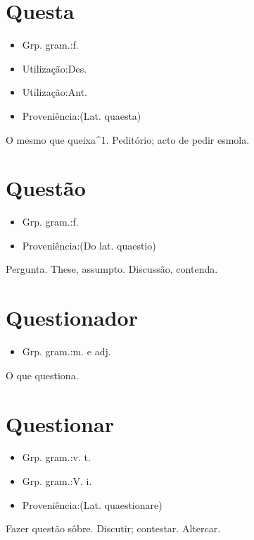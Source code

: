 \section{Questa}
\begin{itemize}
\item {Grp. gram.:f.}
\end{itemize}
\begin{itemize}
\item {Utilização:Des.}
\end{itemize}
\begin{itemize}
\item {Utilização:Ant.}
\end{itemize}
\begin{itemize}
\item {Proveniência:(Lat. \textunderscore quaesta\textunderscore )}
\end{itemize}
O mesmo que \textunderscore queixa\textunderscore ^1.
Peditório; acto de pedir esmola.
\section{Questão}
\begin{itemize}
\item {Grp. gram.:f.}
\end{itemize}
\begin{itemize}
\item {Proveniência:(Do lat. \textunderscore quaestio\textunderscore )}
\end{itemize}
Pergunta.
These, assumpto.
Discussão, contenda.
\section{Questionador}
\begin{itemize}
\item {Grp. gram.:m.  e  adj.}
\end{itemize}
O que questiona.
\section{Questionar}
\begin{itemize}
\item {Grp. gram.:v. t.}
\end{itemize}
\begin{itemize}
\item {Grp. gram.:V. i.}
\end{itemize}
\begin{itemize}
\item {Proveniência:(Lat. \textunderscore quaestionare\textunderscore )}
\end{itemize}
Fazer questão sôbre.
Discutir; contestar.
Altercar.
